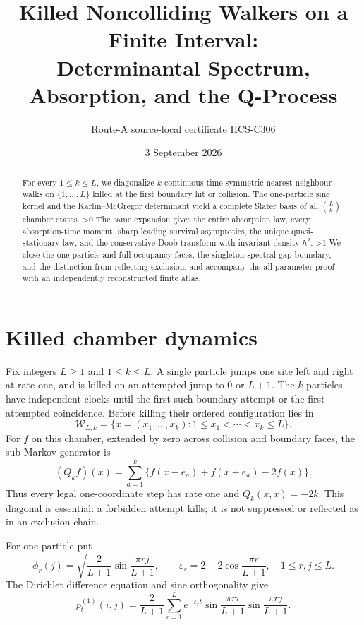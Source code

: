 \documentclass[10pt]{article}
\title{Killed Noncolliding Walkers on a Finite Interval:\\
Determinantal Spectrum, Absorption, and the Q-Process}
\author{Route-A source-local certificate HCS-C306}
\date{3 September 2026}
\providecommand{\CRevisionRound}{2}
\newcommand{\W}{\mathcal W}
\newcommand{\1}{\mathbf 1}
\newcommand{\e}{\varepsilon}
\begin{document}
\maketitle

\begin{abstract}
For every $1\leq k\leq L$, we diagonalize $k$ continuous-time symmetric
nearest-neighbour walks on $\{1,\ldots,L\}$ killed at the first boundary hit
or collision.  The one-particle sine kernel and the Karlin--McGregor
determinant yield a complete Slater basis of all $\binom Lk$ chamber states.
\ifnum\CRevisionRound>0
The same expansion gives the entire absorption law, every absorption-time
moment, sharp leading survival asymptotics, the unique quasi-stationary law,
and the conservative Doob transform with invariant density $h^2$.
\fi
\ifnum\CRevisionRound>1
We close the one-particle and full-occupancy faces, the singleton spectral-gap
boundary, and the distinction from reflecting exclusion, and accompany the
all-parameter proof with an independently reconstructed finite atlas.
\fi
\end{abstract}

\section{Killed chamber dynamics}
Fix integers $L\geq1$ and $1\leq k\leq L$.  A single particle jumps one site
left and right at rate one, and is killed on an attempted jump to $0$ or
$L+1$.  The $k$ particles have independent clocks until the first such
boundary attempt or the first attempted coincidence.  Before killing their
ordered configuration lies in
\[
 \W_{L,k}=\{x=(x_1,\ldots,x_k):1\leq x_1<\cdots<x_k\leq L\}.
\]
For $f$ on this chamber, extended by zero across collision and boundary
faces, the sub-Markov generator is
\begin{equation}\label{eq:Q}
 (Q_kf)(x)=\sum_{a=1}^k\{f(x-e_a)+f(x+e_a)-2f(x)\}.
\end{equation}
Thus every legal one-coordinate step has rate one and $Q_k(x,x)=-2k$.
This diagonal is essential: a forbidden attempt kills; it is not suppressed
or reflected as in an exclusion chain.

For one particle put
\begin{equation}\label{eq:sine}
 \phi_r(j)=\sqrt{\frac2{L+1}}\sin\frac{\pi rj}{L+1},\qquad
 \e_r=2-2\cos\frac{\pi r}{L+1},\quad 1\leq r,j\leq L.
\end{equation}
The Dirichlet difference equation and sine orthogonality give
\begin{equation}\label{eq:p1}
 p_t^{(1)}(i,j)=\frac2{L+1}\sum_{r=1}^L
 e^{-\e_rt}\sin\frac{\pi ri}{L+1}\sin\frac{\pi rj}{L+1}.
\end{equation}
\end{document}
